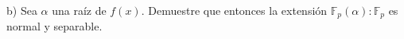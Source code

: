 b) Sea $\alpha$ una raíz de $f(x)$. Demuestre que entonces la extensión $\mathbb{F}_p(\alpha):\mathbb{F}_p$ es normal y separable.

